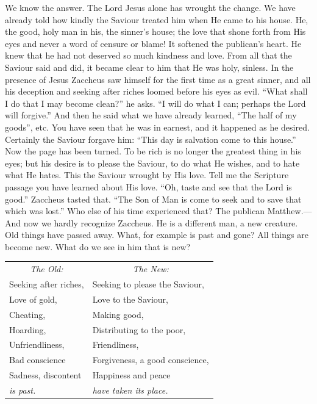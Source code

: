 We know the answer. The Lord Jesus alone has wrought the change. We have already told how kindly the Saviour treated him when He came to his house. He, the good, holy man in his, the sinner’s house; the love that shone forth from His eyes and never a word of censure or blame! It softened the publican’s heart. He knew that he had not deserved so much kindness and love. From all that the Saviour said and did, it became clear to him that He was holy, sinless. In the presence of Jesus Zaccheus saw himself for the first time as a great sinner, and all his deception and seeking after riches loomed before his eyes as evil. “What shall I do that I may become clean?” he asks. “I will do what I can; perhaps the Lord will forgive.” And then he said what we have already learned, “The half of my goods”, etc. You have seen that he was in earnest, and it happened as he desired. Certainly the Saviour forgave him: “This day is salvation come to this house.” Now the page has been turned. To be rich is no longer the greatest thing in his eyes; but his desire is to please the Saviour, to do what He wishes, and to hate what He hates. This the Saviour wrought by His love. Tell me the Scripture passage you have learned about His love. “Oh, taste and see that the Lord is good.” Zaccheus tasted that. “The Son of Man is come to seek and to save that which was lost.” Who else of his time experienced that? The publican Matthew.—And now we hardly recognize Zaccheus. He is a different man, a new creature. Old things have passed away. What, for example is past and gone? All things are become new. What do we see in him that is new?

\begin{center}
\begin{tabular}{ll}
\multicolumn{1}{c}{\emph{The Old:}} & \multicolumn{1}{c}{\emph{The New:}}\\
Seeking after riches, & Seeking to please the Saviour,\\
Love of gold, & Love to the Saviour,\\
Cheating, & Making good,\\
Hoarding, & Distributing to the poor,\\
Unfriendliness, & Friendliness,\\
Bad conscience & Forgiveness, a good conscience,\\
Sadness, discontent & Happiness and peace\\
\emph{is past.} & \emph{have taken its place.}
\end{tabular}
\end{center}

